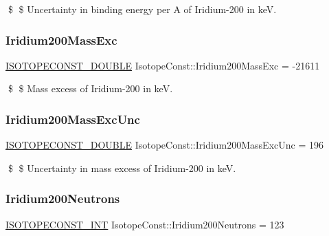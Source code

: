 \$ \$ Uncertainty in binding energy per A of Iridium-\/200 in keV. \mbox{\label{group___isotope_const-_iridium-_ir200_ga03ff2a91029f4a57265d7b9890a7b601}} 
\subsubsection{\texorpdfstring{Iridium200\+Mass\+Exc}{Iridium200MassExc}}
{\footnotesize\ttfamily \mbox{\hyperlink{group___isotope_const-_macros_ga8f45a7272ce02c0b4c65c44636ed719a}{I\+S\+O\+T\+O\+P\+E\+C\+O\+N\+S\+T\+\_\+\+D\+O\+U\+B\+LE}} Isotope\+Const\+::\+Iridium200\+Mass\+Exc = -\/21611}

\$ \$ Mass excess of Iridium-\/200 in keV. \mbox{\label{group___isotope_const-_iridium-_ir200_ga930f24d6dba2bc7ff631cbbff2ba01f8}} 
\subsubsection{\texorpdfstring{Iridium200\+Mass\+Exc\+Unc}{Iridium200MassExcUnc}}
{\footnotesize\ttfamily \mbox{\hyperlink{group___isotope_const-_macros_ga8f45a7272ce02c0b4c65c44636ed719a}{I\+S\+O\+T\+O\+P\+E\+C\+O\+N\+S\+T\+\_\+\+D\+O\+U\+B\+LE}} Isotope\+Const\+::\+Iridium200\+Mass\+Exc\+Unc = 196}

\$ \$ Uncertainty in mass excess of Iridium-\/200 in keV. \mbox{\label{group___isotope_const-_iridium-_ir200_ga82b2234386291501da72fd9422797f2b}} 
\subsubsection{\texorpdfstring{Iridium200\+Neutrons}{Iridium200Neutrons}}
{\footnotesize\ttfamily \mbox{\hyperlink{group___isotope_const-_macros_ga5f18360b3e99483a35c32d789e62621c}{I\+S\+O\+T\+O\+P\+E\+C\+O\+N\+S\+T\+\_\+\+I\+NT}} Isotope\+Const\+::\+Iridium200\+Neutrons = 123}

